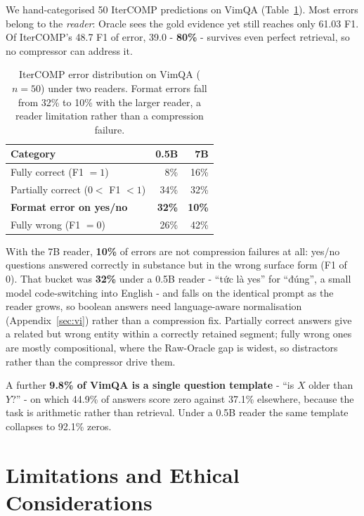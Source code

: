 \documentclass[11pt]{article}
\begin{document}
We hand-categorised 50 IterCOMP predictions on VimQA (Table~\ref{tab:errors}).
Most errors belong to the \emph{reader}: Oracle sees the gold evidence yet still
reaches only 61.03 F1. Of IterCOMP's 48.7 F1 of error, 39.0 - \textbf{80\%} -
survives even perfect retrieval, so no compressor can address it.

\begin{table}[htbp]
\centering
\small
\begin{tabular}{lrr}
\toprule
Category & 0.5B & 7B \\
\midrule
Fully correct (F1 $=1$) & 8\% & 16\% \\
Partially correct ($0<$ F1 $<1$) & 34\% & 32\% \\
\textbf{Format error on yes/no} & \textbf{32\%} & \textbf{10\%} \\
Fully wrong (F1 $=0$) & 26\% & 42\% \\
\bottomrule
\end{tabular}
\caption{IterCOMP error distribution on VimQA ($n=50$) under two readers. Format
errors fall from 32\% to 10\% with the larger reader, a reader limitation rather
than a compression failure.}
\label{tab:errors}
\end{table}

With the 7B reader, \textbf{10\%} of errors are not compression failures at all:
yes/no questions answered correctly in substance but in the wrong surface form
(F1 of 0). That bucket was \textbf{32\%} under a 0.5B reader - ``tức là yes''
for ``đúng'', a small model code-switching into English - and falls on the
identical prompt as the reader grows, so boolean answers need language-aware
normalisation (Appendix~\ref{sec:vi}) rather than a compression fix.
Partially correct answers give a related but wrong entity within a
correctly retained segment; fully wrong ones are mostly compositional,
where the Raw-Oracle gap is widest, so distractors rather than the compressor
drive them.

A further \textbf{9.8\% of VimQA is a single question template} - ``is $X$ older
than $Y$?'' - on which 44.9\% of answers score zero against 37.1\% elsewhere,
because the task is arithmetic rather than retrieval. Under a 0.5B reader the
same template collapses to 92.1\% zeros.

\section{Limitations and Ethical Considerations}
\label{sec:limitations}
\end{document}
